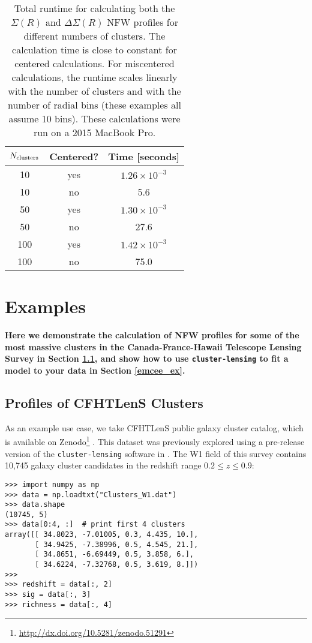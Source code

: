 \documentclass[twocolumn]{aastex6}
\newcommand{\code}{\lstinline[style=codeintext]}
\begin{document}
\begin{table}
\centering
\begin{tabular}{ccc}
	$N_{\rm clusters}$ & Centered? & Time [seconds] \\ \hline
	10   & yes & $1.26\times10^{-3}$ \\
	10   & no  & 5.6 \\ 
	50   & yes & $1.30\times10^{-3}$ \\
	50   & no  & 27.6 \\
	100 & yes & $1.42\times10^{-3}$ \\
	100 & no  & 75.0 \\
	
\end{tabular}
\caption{Total runtime for calculating both the $\Sigma(R)$ and $\Delta\Sigma(R)$ NFW profiles for different numbers of clusters. The calculation time is close to constant for centered calculations. For miscentered calculations, the runtime scales linearly with the number of clusters and with the number of radial bins (these examples all assume 10 bins). These calculations were run on a 2015 MacBook Pro.}
\label{runtimetable}
\end{table}


\section{Examples}
\label{ex}
{\bf Here we demonstrate the calculation of NFW profiles for some of the most massive clusters in the Canada-France-Hawaii Telescope Lensing Survey \citep[CFHTLenS;][]{Heymans12, Erben13} in Section \ref{cfhtlens_ex}, and show how to use \code{cluster-lensing} to fit a model to your data in Section \ref{emcee_ex}.}


\subsection{Profiles of CFHTLenS Clusters}
\label{cfhtlens_ex}

As an example use case, we take CFHTLenS public galaxy cluster catalog, which is available on Zenodo\footnote{\url{http://dx.doi.org/10.5281/zenodo.51291}} \citep{3DMFcatalog}. This dataset was previously explored using a pre-release version of the \code{cluster-lensing} software in \citet{Ford14, Ford15}. The W1 field of this survey contains 10,745 galaxy cluster candidates in the redshift range $0.2 \le z \le 0.9$:
\begin{verbatim}
>>> import numpy as np
>>> data = np.loadtxt("Clusters_W1.dat")
>>> data.shape
(10745, 5)
>>> data[0:4, :]  # print first 4 clusters
array([[ 34.8023, -7.01005, 0.3, 4.435, 10.],
       [ 34.9425, -7.38996, 0.5, 4.545, 21.],
       [ 34.8651, -6.69449, 0.5, 3.858, 6.],
       [ 34.6224, -7.32768, 0.5, 3.619, 8.]])
>>>
>>> redshift = data[:, 2]
>>> sig = data[:, 3]
>>> richness = data[:, 4]
\end{verbatim}
\end{document}
